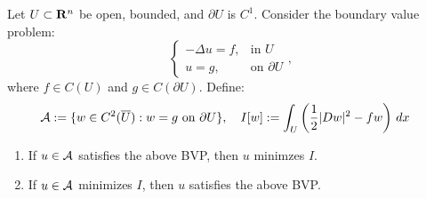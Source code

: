 \begin{theorem}
	Let $U \subset \mathbf{R}^n$ be open, bounded, and $\partial U$ is $C^1$. Consider the boundary value problem:
		\[
		\begin{cases}
			-\Delta u = f, & \text{in } U \\
			u = g,& \text{on } \partial U	
		\end{cases},
		\]
	where $f \in C(U)$ and $g \in C(\partial U)$. Define:
	\begin{align*}
		\mathcal{A} & :=\{w \in C^2(\overline{U}) : w = g \text{ on }\partial U\},\hspace{10pt}I[w] := \int_{U}^{} \left( \frac{1}{2}|Dw|^2 - fw \right)\,dx 
	\end{align*}
	\begin{enumerate}[label = (\alph*),itemsep=1pt,topsep=3pt]
		\item If $u \in \mathcal{A}$ satisfies the above BVP, then $u$ minimzes $I$.
		\item If $u \in \mathcal{A}$ minimizes $I$, then $u$ satisfies the above BVP.
	\end{enumerate}
\end{theorem}
